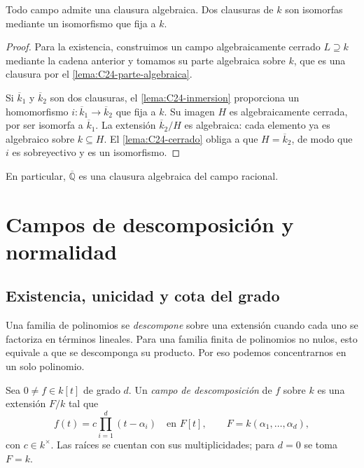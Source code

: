 \begin{teo}\label{teo:C24-clausura}
Todo campo admite una clausura algebraica. Dos clausuras de $k$ son isomorfas mediante un isomorfismo que fija a $k$.
\end{teo}
\begin{proof}
Para la existencia, construimos un campo algebraicamente cerrado $L\supseteq k$ mediante la cadena anterior y tomamos su parte algebraica sobre $k$, que es una clausura por el \cref{lema:C24-parte-algebraica}.

Si $\overline k_1$ y $\overline k_2$ son dos clausuras, el \cref{lema:C24-inmersion} proporciona un homomorfismo $i:\overline k_1\to\overline k_2$ que fija a $k$. Su imagen $H$ es algebraicamente cerrada, por ser isomorfa a $\overline k_1$. La extensión $\overline k_2/H$ es algebraica: cada elemento ya es algebraico sobre $k\subseteq H$. El \cref{lema:C24-cerrado} obliga a que $H=\overline k_2$, de modo que $i$ es sobreyectivo y es un isomorfismo.
\end{proof}
En particular, $\overline{\mathbb Q}$ es una clausura algebraica del campo racional.

\section{Campos de descomposición y normalidad}
\subsection{Existencia, unicidad y cota del grado}
Una familia de polinomios se \emph{descompone} sobre una extensión cuando cada uno se factoriza en términos lineales. Para una familia finita de polinomios no nulos, esto equivale a que se descomponga su producto. Por eso podemos concentrarnos en un solo polinomio.

\begin{defi}
Sea $0\ne f\in k[t]$ de grado $d$. Un \emph{campo de descomposición} de $f$ sobre $k$ es una extensión $F/k$ tal que
\[
f(t)=c\prod_{i=1}^d(t-\alpha_i)\quad\text{en }F[t],
\qquad F=k(\alpha_1,\ldots,\alpha_d),
\]
con $c\in k^\times$. Las raíces se cuentan con sus multiplicidades; para $d=0$ se toma $F=k$.
\end{defi}

